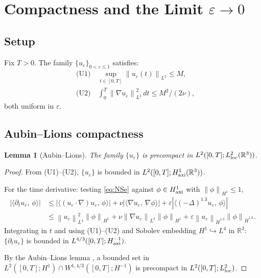 \documentclass{article}
\newtheorem{lemma}[theorem]{Lemma}
\theoremstyle{definition}
\theoremstyle{remark}
\newcommand{\R}{\mathbb{R}}
\newcommand{\e}{\varepsilon}
\newcommand{\norm}[1]{\left\|#1\right\|}
\newcommand{\inner}[2]{\langle #1,\, #2\rangle}
\begin{document}
\section{Compactness and the Limit \texorpdfstring{$\e\to 0$}{epsilon to 0}}
\label{sec:compact}

\subsection{Setup}

Fix $T > 0$.  The family $\{u_\e\}_{0<\e\le 1}$ satisfies:
\begin{align}
  &\text{(U1)}\quad \sup_{t\in[0,T]}\norm{u_\e(t)}_{L^2} \le M,
    \label{U1}\\
  &\text{(U2)}\quad \int_0^T\norm{\nabla u_\e}_{L^2}^2\,dt
    \le M^2/(2\nu),
    \label{U2}
\end{align}
both uniform in $\e$.

\subsection{Aubin--Lions compactness}

\begin{lemma}[Aubin--Lions]\label{lem:aubin}
  The family $\{u_\e\}$ is precompact in $L^2([0,T];L^2_{\rm loc}(\R^3))$.
\end{lemma}
\begin{proof}
  From (U1)--(U2), $\{u_\e\}$ is bounded in
  $L^2([0,T];H^1_{\rm axi}(\R^3))$.

  For the time derivative: testing \eqref{eq:NSe} against
  $\phi\in H^1_{\rm axi}$ with $\norm{\phi}_{H^1}\le 1$,
  \begin{align*}
    |\inner{\partial_t u_\e}{\phi}|
    &\le |\inner{(u_\e\cdot\nabla)u_\e}{\phi}|
      + \nu|\inner{\nabla u_\e}{\nabla\phi}|
      + \e|\inner{(-\Delta)^{1.3}u_\e}{\phi}|\\
    &\le \norm{u_\e}_{L^4}^2\norm{\phi}_{H^1}
      + \nu\norm{\nabla u_\e}_{L^2}\norm{\phi}_{H^1}
      + \e\norm{u_\e}_{\dot H^{1.3}}\norm{\phi}_{\dot H^{1.3}}.
  \end{align*}
  Integrating in $t$ and using (U1)--(U2) and Sobolev embedding
  $H^1\hookrightarrow L^4$ in $\R^3$:  $\{\partial_t u_\e\}$ is
  bounded in $L^{4/3}([0,T];H^{-1}_{\rm axi})$.

  By the Aubin--Lions lemma \cite{Aubin1963,Lions1969}, a bounded set in
  $L^2([0,T];H^1)\cap W^{1,4/3}([0,T];H^{-1})$ is precompact in
  $L^2([0,T];L^2_{\rm loc})$.
\end{proof}
\end{document}

